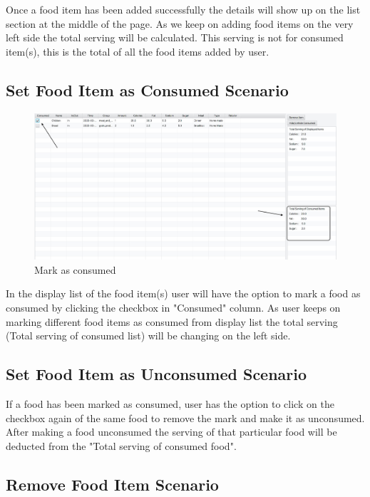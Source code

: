 \documentclass{scrreprt}
\begin{document}
Once a food item has been added successfully the details will show up on the list section at the middle of the page. As we keep on adding food items on the very left side the total serving will be calculated. This serving is not for consumed item(s), this is the total of all the food items added by user.
\pagebreak
\subsection{Set Food Item as Consumed Scenario}

\begin{figure}[!htbp]
\centering
\includegraphics[width=15cm]{pictures/consumed.png}
\caption*{Mark as consumed}
\end{figure}

\FloatBarrier

In the display list of the food item(s) user will have the option to mark a food as consumed by clicking the checkbox in "Consumed" column. As user keeps on marking different food items as consumed from display list the total serving (Total serving of consumed list) will be changing on the left side.

\subsection{Set Food Item as Unconsumed Scenario}

If a food has been marked as consumed, user has the option to click on the checkbox again of the same food to remove the mark and make it as unconsumed. After making a food unconsumed the serving of that particular food will be deducted from the "Total serving of consumed food".

\subsection{Remove Food Item Scenario}
\end{document}
